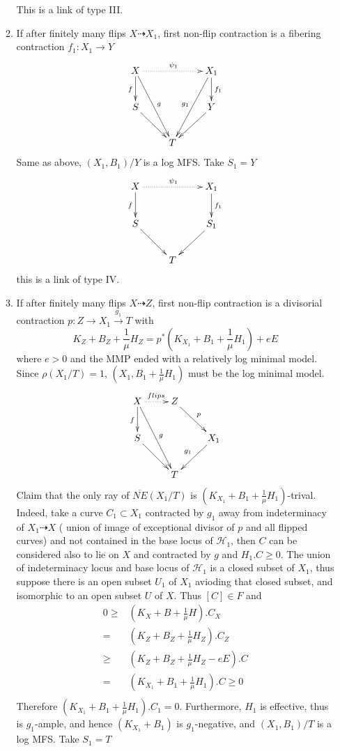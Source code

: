 \documentclass{article}
\begin{document}
\begin{enumerate}[(A)]
\begin{enumerate}[1)]
		This is a link of type III. 	
		\item If after finitely many flips $ X\dashrightarrow X_1 $, first non-flip contraction is a fibering contraction $ f_1:X_1\to Y  $
		$$ \xymatrix{
			X\ar[d]_f\ar[ddr]^g\ar@{.>}[rr]^{\psi_1}&&X_1\ar[d]^{f_1}\ar[ddl]_{g_1}\\
			S\ar[dr]&&Y\ar[dl]\\
			&T &}$$
		Same as above, $ (X_1,B_1)/Y $ is a log MFS. Take $ S_1=Y $
		$$ \xymatrix{
			X\ar[d]_f\ar@{.>}[rr]^{\psi_1}&&X_1\ar[d]^{f_1}\\
			S\ar[dr]&&S_1\ar[dl]\\
			&T &}$$
		this is a link of type IV. 
		\item If after finitely many flips $ X\dashrightarrow Z $, first non-flip contraction is a divisorial contraction $ p:Z\to X_1\xrightarrow{g_1}T $ with 
		$$ K_Z+B_Z+\frac{1}{\mu}H_Z=p^*(K_{X_1}+B_1+\frac{1}{\mu}H_1)+eE $$
		where $ e>0 $ and the MMP ended with a relatively log minimal model. Since  $ \rho(X_1/T)=1 $, $ (X_1,B_1+\frac{1}{\mu}H_1) $ must be the log minimal model.
		$$ \xymatrix{
			X\ar[d]_f\ar[ddr]^g\ar@{.>}[r]^{flips}&Z\ar[rd]^{p}&\\
			S\ar[dr]&&X_1\ar[dl]_{g_1}\\
			&T&}$$
		Claim that the only ray of $ \overline{NE}(X_1/T) $ is $ (K_{X_1}+B_1+\frac{1}{\mu}H_1) $-trival. Indeed, take a curve $ C_1\subset X_1 $ contracted by $ g_1 $ away from indeterminacy of $ X_1\dashrightarrow X $ ( union of image of exceptional divisor of $ p $ and all flipped curves) and not contained in the base locus of $ \mathcal{H}_1 $, then $ C $ can be considered also to lie on $ X $ and contracted by $ g $ and $ H_1.C\geqslant 0 $.  The union of  indeterminacy locus and base locus of $ \mathcal{H}_1 $ is a closed subset of $ X_1 $, thus suppose there is an open subset $ U_1 $ of $ X_1 $ avioding that closed subset, and  isomorphic to an open subset $ U $ of $ X $. Thus $ [C]\in F $ and
		\begin{equation*}
			\begin{aligned}
				0\geqslant& (K_X+B+\frac{1}{\mu}H).C_X\\
				=&(K_Z+B_Z+\frac{1}{\mu}H_Z).C_Z\\
				\geqslant&(K_Z+B_Z+\frac{1}{\mu}H_Z-eE).C\\
				=&(K_{X_1}+B_1+\frac{1}{\mu}H_1).C\geqslant 0\\
			\end{aligned}
		\end{equation*}
		Therefore $ (K_{X_1}+B_1+\frac{1}{\mu}H_1).C_1=0 $. Furthermore, $ H_1 $ is effective, thus is $ g_1 $-ample, and hence $ (K_{X_1}+B_1) $ is $ g_1 $-negative, and $ (X_1,B_1)/T $ is a log MFS. Take $ S_1=T $

\end{enumerate}
\end{enumerate}
\end{document}
